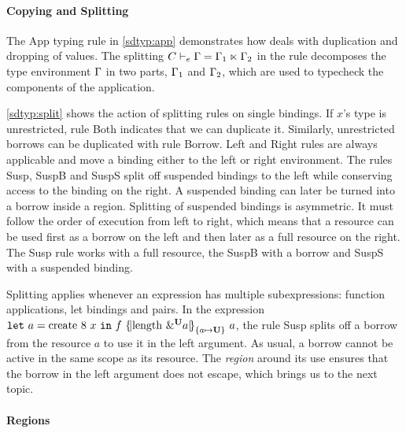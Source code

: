 \paragraph{Copying and Splitting}
\label{sdtyping:split}

The {\sc App} typing rule in \cref{sdtyp:app} demonstrates how \lang
deals with duplication and dropping of values.
The splitting $C \vdash_e \Gamma = \Gamma_1 \ltimes \Gamma_2$ in the rule decomposes the
type environment $\Gamma$ in two parts, $\Gamma_1$ and $\Gamma_2$, which are used
to typecheck the components of the application.

\cref{sdtyp:split} shows the action of splitting rules on single
bindings. If $x$'s type is unrestricted,
rule {\sc Both} indicates that we can duplicate it.
Similarly, unrestricted borrows can be duplicated with rule
{\sc Borrow}.
{\sc Left} and {\sc Right} rules are always applicable and move a binding
either to the left or right environment.
The rules {\sc Susp}, {\sc SuspB} and {\sc SuspS}
split off suspended bindings to
the left while conserving access to the binding on the right.
A suspended binding can later be turned
into a borrow inside a region. Splitting of suspended bindings is
asymmetric. It must follow the order of execution from left to right,
which means that a resource can be used first as a borrow on the left
and then later as a full resource on the right. The {\sc Susp} rule
works with a full resource, the {\sc SuspB}
with a borrow and {\sc SuspS} with a suspended binding.

Splitting applies whenever an
expression has multiple subexpressions:  function applications,
let bindings and pairs. In the
expression
$\letin{a}{\text{create}\ 8\ x}
{f\ \region[{}]{\Sone a\IBORROW}{\text{length}\ \borrow[\IBORROW]{a}}\ a}$,
the rule {\sc Susp} splits off a borrow from  the resource
$a$ to use it in the left argument.
As usual, a borrow cannot be active in the same scope as its resource.
The \emph{region} around its use ensures that the borrow in the left argument
does not
escape, which brings us to the next topic.

\paragraph{Regions}
\label{sdtyping:regions}



